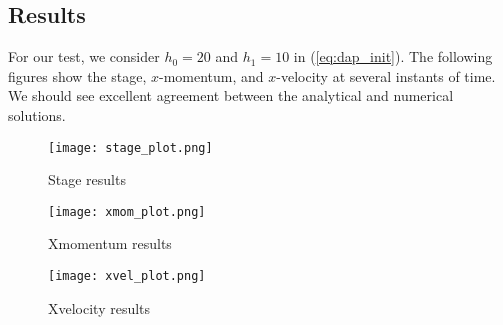 \subsection{Results}

For our test, we consider $h_0=20$ and $h_1=10$ in (\ref{eq:dap_init}).
The following figures show the stage, $x$-momentum, and $x$-velocity at several instants of time. We should see excellent agreement between the analytical and numerical solutions. 

\begin{figure}[h]
\begin{center}
\texttt{[image: stage\_plot.png]}
\end{center}
\caption{Stage results}
\end{figure}


\begin{figure}[h]
\begin{center}
\texttt{[image: xmom\_plot.png]}
\end{center}
\caption{Xmomentum results}
\end{figure}


\begin{figure}[h]
\begin{center}
\texttt{[image: xvel\_plot.png]}
\end{center}
\caption{Xvelocity results}
\end{figure}


\endinput
